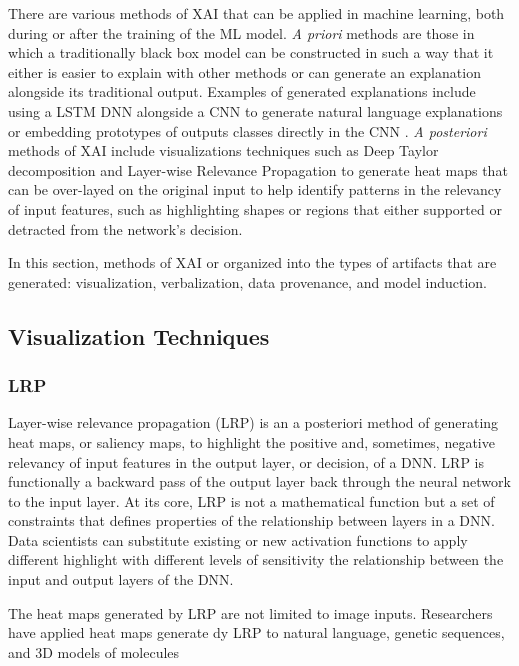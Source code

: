 There are various methods of XAI that can be applied in machine learning, both during or after the training of the ML model.  \textit{A priori} methods are those in which a traditionally black box model can be constructed in such a way that it either is easier to explain with other methods or can generate an explanation alongside its traditional output.  Examples of generated explanations include using a LSTM DNN alongside a CNN to generate natural language explanations \cite{10.1007/978-3-319-46493-0_1} or embedding prototypes of outputs classes directly in the CNN \cite{Chen2018}.  \textit{A posteriori} methods of XAI include visualizations techniques such as Deep Taylor decomposition and Layer-wise Relevance Propagation to generate heat maps that can be over-layed on the original input to help identify patterns in the relevancy of input features, such as highlighting shapes or regions that either supported or detracted from the network's decision.

In this section, methods of XAI or organized into the types of artifacts that are generated: visualization, verbalization, data provenance, and model induction.

\subsection{Visualization Techniques}

\subsubsection{LRP}

Layer-wise relevance propagation (LRP) is an a posteriori method of generating heat maps, or saliency maps, to highlight the positive and, sometimes, negative relevancy of input features in the output layer, or decision, of a DNN.  LRP is functionally a backward pass of the output layer back through the neural network to the input layer.  At its core, LRP is not a mathematical function but a set of constraints that defines properties of the relationship between layers in a DNN.  Data scientists can substitute existing or new activation functions to apply different highlight with different levels of sensitivity the relationship between the input and output layers of the DNN.

The heat maps generated by LRP are not limited to image inputs.  Researchers have applied heat maps generate dy LRP to natural language, genetic sequences, and 3D models of molecules \cite{MONTAVON20181}

